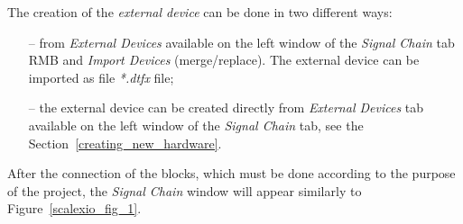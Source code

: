 \documentclass[11pt,a4paper,oneside]{book}
\numberwithin{equation}{section}
\theoremstyle{it}
\theoremstyle{definition}
\begin{document}
The creation of the \textit{external device} can be done in two different ways:
\begin{itemize}
	\item[--] from \textit{External Devices} available on the left window of the \textit{Signal Chain} tab RMB and \textit{Import Devices} (merge/replace). The external device can be imported as file \textit{*.dtfx} file;
	\item[--] the external device can be created directly from \textit{External Devices} tab available on the left window of the \textit{Signal Chain} tab, see the Section~\ref{creating_new_hardware}.
\end{itemize}

After the connection of the blocks, which must be done according to the purpose of the project, the \textit{Signal Chain} window will appear similarly to Figure~\ref{scalexio_fig_1}.
\end{document}

